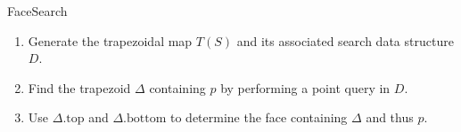         \begin{outline}{FaceSearch}
            \begin{enumerate}
                \item Generate the trapezoidal map $T(S)$ and its associated search data structure $D$.
                
                \item Find the trapezoid $\Delta$ containing $p$ by performing a point query in $D$.
                
                \item Use $\Delta.\text{top}$ and $\Delta.\text{bottom}$ to determine the face containing $\Delta$ and thus $p$.
            \end{enumerate}
        \end{outline}
